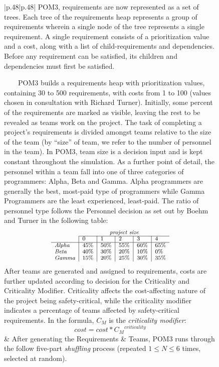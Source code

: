 \documentclass[10pt,journal,compsoc]{IEEEtran}
\begin{document}
\begin{figure*}[!b]
\begin{center}\small
\begin{tabular}{|p{.48\linewidth}|p{.48\linewidth}|}\hline
    POM3, requirements are now represented as a set of trees.  
    Each tree of the requirements
    heap represents a group of requirements wherein a single node of the
    tree represents a single requirement.  A single requirement consists
    of a prioritization value and a cost, along with a list of
    child-requirements and dependencies.  Before any requirement can be
    satisfied, its children and dependencies must first be satisfied.
    
    ~~~~POM3 builds a requirements heap with prioritization values,
    containing
     30 to 500 requirements, with costs from 1 to 100 (values 
     chosen in consultation with Richard Turner).  Initially,
    some percent of the requirements are marked
    as visible, leaving the rest to be revealed as teams work on the
    project.
The task of completing a project's requirements is divided amongst teams
    relative to the size of the team (by ``size'' of team, we refer to
    the number of personnel in the team).  In POM3, team size is a decision
    input and is kept constant throughout the simulation.  As a further
    point of detail, the personnel within a team fall into one of three
    categories of programmers: Alpha, Beta and Gamma.  Alpha programmers
    are generally the best, most-paid type of programmers while Gamma
    Programmers are the least experienced, least-paid.  The ratio of personnel type
    follows the Personnel decision as set out by Boehm and Turner\cite{1204376} in the following table:    
    \[\scriptsize
    \begin{array}{l|l|l|l|l|l}
             \multicolumn{1}{c}{~}   & \multicolumn{5}{c}{\textit{project size}}\\\cline{2-6}
                & 0    & 1    & 2    & 3    & 4    \\ \hline
            \textit{Alpha} & 45\% & 50\% & 55\% & 60\% & 65\% \\ 
            \textit{Beta}  & 40\% & 30\% & 20\% & 10\% & 0\%  \\ 
            \textit{Gamma} & 15\% & 20\% & 25\% & 30\% & 35\% \\ 
        \end{array}
    \]
    After teams are generated and assigned to requirements, costs are
    further updated according to decision for the Criticality and
    Criticality Modifier.  Criticality affects the
    cost-affecting nature of the project being safety-critical, while the
    criticality modifier indicates a percentage of teams affected by
    safety-critical requirements.  In the formula, $C_M$ is the {\em criticality
    modifier}:
    \begin{equation}\label{eq:cmcrit}
    \textit{cost} = \textit{cost} * {C_M}^{\textit{criticality}}
    \end{equation}
    & 
After generating the
    Requirements \& Teams, POM3 runs through the follow five-part {\em shuffling} 
    process (repeated   \mbox{$1 \le N \le 6$} times, selected
    at random).
    

\end{tabular}
\end{center}
\end{figure*}
\end{document}
